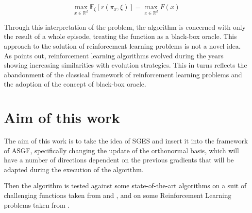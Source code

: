 \begin{equation}\label{problem_rl}  
    \max _{x \in \mathbb{R}^{d}} \mathbb{E}_{\xi}\left[r\left(\pi_x, \xi\right)\right] = \max _{x \in \mathbb{R}^{d}} F(x)
\end{equation}

Through this interpretation of the problem, the algorithm is concerned with only the result of a whole episode, treating the function as a black-box oracle.
This approach to the solution of reinforcement learning problems is not a novel idea. As \cite{Theodorou2010} points out, reinforcement learning algorithms evolved during the years showing increasing similarities with evolution strategies. This in turns reflects the abandonment of the classical framework of reinforcement learning problems and the adoption of the concept of black-box oracle.



\section{Aim of this work}

The aim of this work is to take the idea of SGES and insert it into the framework of ASGF, specifically changing the update of the orthonormal basis, which will have a number of directions dependent on the previous gradients that will be adapted during the execution of the algorithm.

Then the algorithm is tested against some state-of-the-art algorithms on a suit of challenging functions taken from \cite{simulationlib} and \cite{andrei2008unconstrained}, and on some Reinforcement Learning problems taken from \cite{openai}.